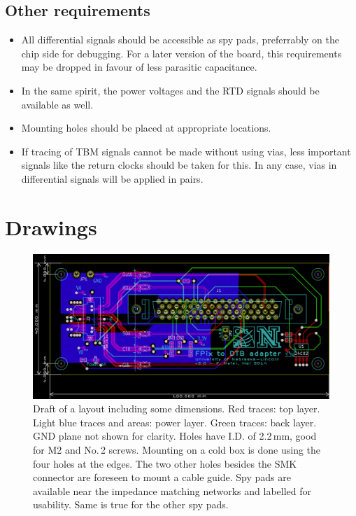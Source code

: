 \section{Other requirements}
\begin{itemize}
    \item All differential signals should be accessible as spy pads, preferrably on the chip side for debugging. For a later version of the board, this requirements may be dropped in favour of less parasitic capacitance.
    \item In the same spirit, the power voltages and the RTD signals should be available as well.
    \item Mounting holes should be placed at appropriate locations.
    \item If tracing of TBM signals cannot be made without using vias, less important signals like the return clocks should be taken for this. In any case, vias in differential signals will be applied in pairs.
\end{itemize}


\chapter{Drawings}


\begin{figure}[hbtp]
	\begin{center}
	\includegraphics[width=1.0\textwidth]{img/FPix2DTBadapterDrawing.png}
	\end{center}
	\caption{Draft of a layout including some dimensions. Red traces: top layer. Light blue traces and areas: power layer. Green traces: back layer. GND plane not shown for clarity. Holes have I.D. of 2.2\,mm, good for M2 and No.\,2 screws. Mounting on a cold box is done using the four holes at the edges. The two other holes besides the SMK connector are foreseen to mount a cable guide. Spy pads are available near the impedance matching networks and labelled for usability. Same is true for the other spy pads.}
	\label{fig:FPix2DTBadapterDrawing}
\end{figure}

